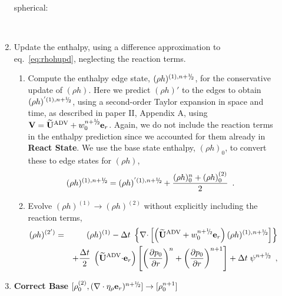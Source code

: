 \begin{description}
\begin{enumerate}
\begin{description}
\item[spherical:]~

\end{description}

\item Update the enthalpy, using a difference approximation to
  eq.~\ref{eq:rhohupd}, neglecting the reaction terms.

  \begin{enumerate}
  \renewcommand{\labelenumii}{{\bf \roman{enumii}}.}

  \item Compute the enthalpy edge state, $(\rho h)^{(1),\nph}$, for
    the conservative update of $(\rho h)$. Here we predict $(\rho h)'$
    to the edges to obtain $(\rho h)^{'(1),\nph}$, 
    using a second-order Taylor expansion in space and
    time, as described in paper II, Appendix A, using $\Vb =
    \uadvtwo+w_0^{\nph} \er$.  Again, we do not include the reaction
    terms in the enthalpy prediction since we accounted for them
    already in {\bf React State}. We use the base state enthalpy,
    $(\rho h)_0$, to convert these to edge states for $(\rho h)$,
\begin{equation}
(\rho h)^{(1),\nph} = 
(\rho h)^{'(1),\nph} + \frac{(\rho h)_0^n + (\rho h)_0^{(2)}}{2} \enskip .
\end{equation}

   \item Evolve $(\rho h)^{(1)} \rightarrow (\rho h)^{(2)}$ without
     explicitly including the reaction terms,
\begin{eqnarray}
(\rho h)^{(2')} &=& (\rho h)^{(1)} - \dt \; \left\{ \nablab \cdotb \left[ \left(\uadvtwo+w_0^{\nph} \er\right)  
(\rho h)^{(1),\nph} \right] \right\} \nonumber \\
&& + \frac{\dt}{2} \; \left(\uadvtwo \cdotb \er\right)
\left [ \left(\frac{\partial p_0}{\partial r} \right)^{n}
      + \left(\frac{\partial p_0}{\partial r} \right)^{n+1}  \right ] 
+ \dt \; \psi^{\nph} \enskip ,
\end{eqnarray}

\end{enumerate}

\item {\bf Correct Base}
$[\rho_0^{(2)}, (\nabla\cdot\etarho\er)^{\nph}] \rightarrow [\rho_0^{n+1}]$


\end{enumerate}
\end{description}

